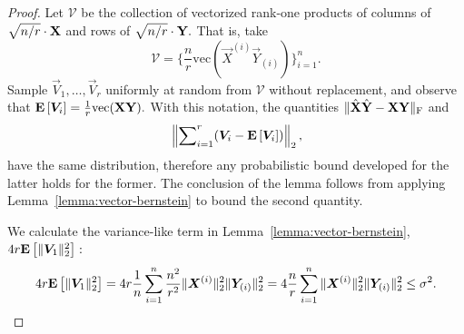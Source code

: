 \begin{proof}
 Let $\mathcal{V}$ be the collection of vectorized rank-one products of columns of $\sqrt{n/r}\cdot{\ensuremath{\bm{\mathrm{X}}}}$ and rows of $\sqrt{n/r}\cdot{\ensuremath{\bm{\mathrm{Y}}}}.$ That is, take
\[
 \mathcal{V} = \bigg\{ \frac{n}{r} \text{vec}(\vec{X}^{(i)} \vec{Y}_{(i)}) \bigg\}_{i=1}^n.
\]
Sample $\vec{V}_1, \ldots, \vec{V}_r$ uniformly at random from $\mathcal{V}$ without replacement, and observe that ${{\mathbf E}\left[\bm{V}_i\right]} = {1\over r} \text{vec}({\bm{\mathrm{X}}} {\bm{\mathrm{Y}}}).$
With this notation, the quantities $\mbox{}\|\hat{{\bm{\mathrm{X}}}} \hat{{\bm{\mathrm{Y}}}} - {\bm{\mathrm{X}}} {\bm{\mathrm{Y}}}\|_\mathrm{F}$ and
\[
 \mbox{}\left\|\sum\nolimits_{i=1}^r (\bm{V}_i - {{\mathbf E}\left[\bm{V}_i\right]})\right\|_2,
\]
have the same distribution, therefore any probabilistic bound developed for the latter holds for the former. The conclusion of the lemma follows from applying
Lemma~\ref{lemma:vector-bernstein} to bound the second quantity.

We calculate the variance-like term in Lemma~\ref{lemma:vector-bernstein}, $4 r {{\mathbf E}\left[\mbox{}\|\bm{V}_1\|_2^2\right]}:$
\[
 4 r {{\mathbf E}\left[\mbox{}\|\bm{V}_1\|_2^2\right]} = 4r {1\over n} \sum_{i=1}^n {n^2\over r^2} \mbox{}\|\bm{X}^{(i)}\|_2^2 \mbox{}\|\bm{Y}_{(i)}\|_2^2 = 4{n\over r} \sum_{i=1}^n \mbox{}\|\bm{X}^{(i)}\|_2^2 \mbox{}\|\bm{Y}_{(i)}\|_2^2 \leq \sigma^2.
\]


\end{proof}

